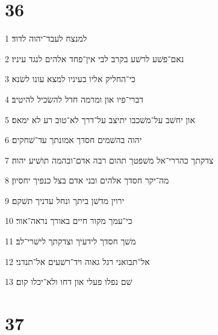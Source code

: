 \chapter{36}

\par 1 למנצח לעבד־יהוה לדוד׃
\par 2 נאם־פשׁע לרשׁע בקרב לבי אין־פחד אלהים לנגד עיניו׃
\par 3 כי־החליק אליו בעיניו למצא עונו לשׂנא׃
\par 4 דברי־פיו און ומרמה חדל להשׂכיל להיטיב׃
\par 5 און יחשׁב על־משׁכבו יתיצב על־דרך לא־טוב רע לא ימאס׃
\par 6 יהוה בהשׁמים חסדך אמונתך עד־שׁחקים׃
\par 7 צדקתך כהררי־אל משׁפטך תהום רבה אדם־ובהמה תושׁיע יהוה׃
\par 8 מה־יקר חסדך אלהים ובני אדם בצל כנפיך יחסיון׃
\par 9 ירוין מדשׁן ביתך ונחל עדניך תשׁקם׃
\par 10 כי־עמך מקור חיים באורך נראה־אור׃
\par 11 משׁך חסדך לידעיך וצדקתך לישׁרי־לב׃
\par 12 אל־תבואני רגל גאוה ויד־רשׁעים אל־תנדני׃
\par 13 שׁם נפלו פעלי און דחו ולא־יכלו קום׃

\chapter{37}

